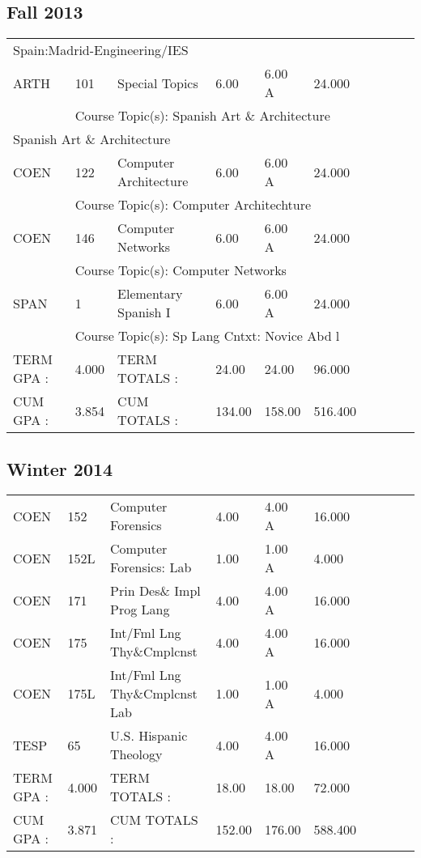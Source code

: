 \documentclass{scrartcl}\usepackage[T1]{fontenc}
\begin{document}
\subsection{Fall 2013}
\begin{tabular}{ l  l  l  l  l  l  l  l  l  l }
\multicolumn{10}{l}{Spain:Madrid-Engineering/IES}
\\
ARTH&101&Special Topics&6.00&6.00 A&24.000& & & & \\
\multicolumn{1}{l}{ }
&
\multicolumn{9}{l}{Course Topic(s): Spanish Art \& Architecture}
\\
\multicolumn{10}{l}{Spanish Art \& Architecture}
\\
COEN&122&Computer Architecture&6.00&6.00 A&24.000& & & & \\
\multicolumn{1}{l}{ }
&
\multicolumn{9}{l}{Course Topic(s): Computer Architechture}
\\
COEN&146&Computer Networks&6.00&6.00 A&24.000& & & & \\
\multicolumn{1}{l}{ }
&
\multicolumn{9}{l}{Course Topic(s): Computer Networks}
\\
SPAN&1&Elementary Spanish I&6.00&6.00 A&24.000& & & & \\
\multicolumn{1}{l}{ }
&
\multicolumn{9}{l}{Course Topic(s): Sp Lang Cntxt: Novice Abd l}
\\
\hline
TERM GPA :&4.000&TERM TOTALS :&24.00&24.00&96.000& & & & \\
CUM GPA :&3.854&CUM TOTALS :&134.00&158.00&516.400& & & & \\\end{tabular}
\subsection{Winter 2014}
\begin{tabular}{ l  l  l  l  l  l  l  l  l  l }
COEN&152&Computer Forensics&4.00&4.00 A&16.000& & & & \\
COEN&152L&Computer Forensics: Lab&1.00&1.00 A&4.000& & & & \\
COEN&171&Prin Des\& Impl Prog Lang&4.00&4.00 A&16.000& & & & \\
COEN&175&Int/Fml Lng Thy\&Cmplcnst&4.00&4.00 A&16.000& & & & \\
COEN&175L&Int/Fml Lng Thy\&Cmplcnst Lab&1.00&1.00 A&4.000& & & & \\
TESP&65&U.S. Hispanic Theology&4.00&4.00 A&16.000& & & & \\
\hline
TERM GPA :&4.000&TERM TOTALS :&18.00&18.00&72.000& & & & \\
CUM GPA :&3.871&CUM TOTALS :&152.00&176.00&588.400& & & & \\\end{tabular}
\end{document}
